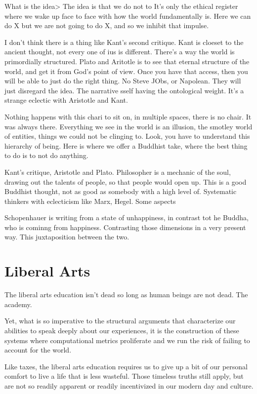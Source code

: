 \documentclass[12pt,letterpaper]{article}
\begin{document}
What is the idea> The idea is that we do not to  It's only the ethical register where we wake up face to face with how the world fundamentally is.  Here we can do X but we are not going to do X, and so we inhibit that impulse.

I don't think there is a thing like Kant's second critique.  Kant is cloeset to the ancient thought, not every one of ius is different.  There's a way the world is primordially structured.  Plato and Aritotle is to see that eternal structure of the world, and get it from God's point of view.  Once you have that access, then you will be able to just do the right thing.  No Steve JObs, or Napolean.  They will just disregard the idea.  The narrative sself having the ontological weight.  It's a strange eclectic with Aristotle and Kant.

Nothing happens with this chari to sit on, in multiple spaces, there is no chair.  It was always there.  Everything we see in the world is an illusion, the smotley world of entities, things we could not be clinging to.  Look, you have to understand this hierarchy of being.  Here is where we offer a Buddhist take, where the best thing to do is to not do anything.

Kant's critique, Aristotle and Plato.  Philosopher is a mechanic of the soul, drawing out the talents of people, so that people would open up.  This is a good Buddhist thought, not as good as somebody with a high level of.  Systematic thinkers with eclecticism like Marx, Hegel.  Some aspects 

Schopenhauer is writing from a state of unhappiness, in contrast tot he Buddha, who is cominng from happiness.  Contrasting those dimensions in a very present way.  This juxtaposition between the two.  

\section{Liberal Arts}
The liberal arts education isn't dead so long as human beings are not dead.  The academy. 

Yet, what is so imperative to the structural arguments that characterize our abilities to speak deeply about our experiences, it is the construction of these systems where computational metrics proliferate and we run the risk of failing to account for the world.

Like taxes, the liberal arts education requires us to give up a bit of our personal comfort to live a life that is less wasteful.  Those timeless truths still apply, but are not so readily apparent or readily incentivized in our modern day and culture.




\pagebreak
\listoffigures

\printindex
\end{document}
